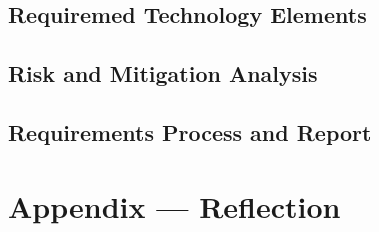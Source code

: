 \documentclass{article}
\begin{document}
\subsection{Requiremed Technology Elements}

\subsection{Risk and Mitigation Analysis}

\subsection{Requirements Process and Report}

\newpage{}


\section*{Appendix --- Reflection}

\end{document}
